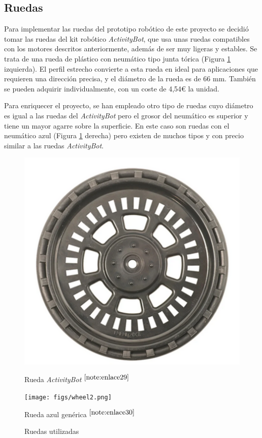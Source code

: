 \subsection{Ruedas}
\label{subsec:ruedas}

Para implementar las ruedas del prototipo robótico de este proyecto se decidió tomar las ruedas del kit robótico \textit{ActivityBot}, que usa unas ruedas compatibles con los motores descritos anteriormente, además de ser muy ligeras y estables. Se trata de una rueda de plástico con neumático tipo junta tórica (Figura \ref{fig:wheel} izquierda). El perfil estrecho convierte a esta rueda en ideal para aplicaciones que requieren una dirección precisa, y el diámetro de la rueda es de 66 mm. También se pueden adquirir individualmente, con un coste de 4,54€ la unidad.

Para enriquecer el proyecto, se han empleado otro tipo de ruedas cuyo diámetro es igual a las ruedas del \textit{ActivityBot} pero el grosor del neumático es superior y tiene un mayor agarre sobre la superficie. En este caso son ruedas con el neumático azul (Figura \ref{fig:wheel} derecha) pero existen de muchos tipos y con precio similar a las ruedas \textit{ActivityBot}.

\begin{figure}[ht!]
	\centering
	\begin{minipage}{0.3\linewidth}
			\centering
			\includegraphics[width=\linewidth]{figs/wheel.png}
			\caption*{\centering Rueda \textit{ActivityBot} $^{\ref{note:enlace29}}$} 
		\end{minipage}
	\hspace{2cm}
	\begin{minipage}{0.28\linewidth}
			\centering
			\texttt{[image: figs/wheel2.png]}
			\caption*{\centering Rueda azul genérica $^{\ref{note:enlace30}}$} 
		\end{minipage}
	\caption{Ruedas utilizadas}
	\label{fig:wheel}
\end{figure}


